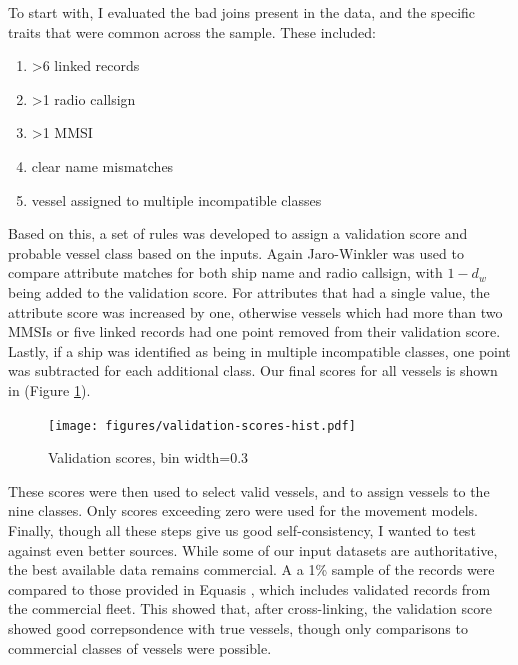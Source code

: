 \documentclass[12pt,letterpaper]{article}
\begin{document}
To start with, I evaluated the bad joins present in the data, and the specific traits that were common across the sample. These included:
\begin{enumerate}[noitemsep]
 \item >6 linked records
 \item >1 radio callsign
 \item >1 MMSI
 \item clear name mismatches
 \item vessel assigned to multiple incompatible classes
\end{enumerate}

Based on this, a set of rules was developed to assign a validation score and probable vessel class based on the inputs.  Again Jaro-Winkler was used to compare attribute matches for both ship name and radio callsign, with $1 - d_w$ being added to the validation score. For attributes that had a single value, the attribute score was increased by one, otherwise vessels which had more than two MMSIs or five linked records had one point removed from their validation score. Lastly, if a ship was identified as being in multiple incompatible classes, one point was subtracted for each additional class. Our final scores for all vessels is shown in (Figure \ref{fig:validation-score-hist}).

\begin{figure}[h!]
  \centering
    \texttt{[image: figures/validation-scores-hist.pdf]}
  \caption {Validation scores, bin width=0.3}
  \label{fig:validation-score-hist}
\end{figure}

These scores were then used to select valid vessels, and to assign vessels to the nine classes. Only scores exceeding zero were used for the movement models. Finally, though all these steps give us good self-consistency, I wanted to test against even better sources.  %
While some of our input datasets are authoritative, the best available data remains commercial. A a 1\% sample of the records were compared to those provided in Equasis \citep{Equasis2011}, which includes validated records from the commercial fleet. This showed that, after cross-linking, the validation score showed good correpsondence with true vessels, though only comparisons to commercial classes of vessels were possible.

\end{document}
